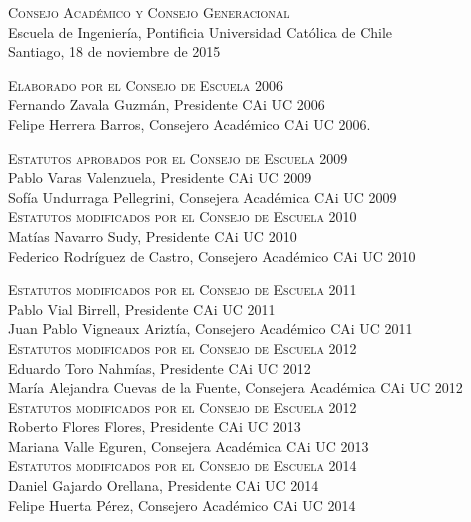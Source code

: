 \documentclass[letterpaper,11pt]{article}
\theoremstyle{definition}%
\begin{document}
\vfill

\begin{sloppypar}
	\textsc{Consejo Académico y Consejo Generacional}\\
	Escuela de Ingeniería, Pontificia Universidad Católica de Chile\\
	Santiago, 18 de noviembre de 2015

	\textsc{Elaborado por el Consejo de Escuela 2006}\\
	Fernando Zavala Guzmán, Presidente CAi UC 2006\\
	Felipe Herrera Barros, Consejero Académico CAi UC 2006.

	\textsc{Estatutos aprobados por el Consejo de Escuela 2009}\\
	Pablo Varas Valenzuela, Presidente CAi UC 2009\\
	Sofía Undurraga Pellegrini, Consejera Académica CAi UC 2009\\

	\textsc{Estatutos modificados por el Consejo de Escuela 2010}\\
	Matías Navarro Sudy, Presidente CAi UC 2010\\
	Federico Rodríguez de Castro, Consejero Académico CAi UC 2010

	\textsc{Estatutos modificados por el Consejo de Escuela 2011}\\
	Pablo Vial Birrell, Presidente CAi UC 2011\\
	Juan Pablo Vigneaux Ariztía, Consejero Académico CAi UC 2011\\

	\textsc{Estatutos modificados por el Consejo de Escuela 2012}\\
	Eduardo Toro Nahmías, Presidente CAi UC 2012\\
	María Alejandra Cuevas de la Fuente, Consejera Académica CAi UC 2012\\

	\textsc{Estatutos modificados por el Consejo de Escuela 2012}\\
	Roberto Flores Flores, Presidente CAi UC 2013\\
	Mariana Valle Eguren, Consejera Académica CAi UC 2013\\

	\textsc{Estatutos modificados por el Consejo de Escuela 2014}\\
	Daniel Gajardo Orellana, Presidente CAi UC 2014\\
	Felipe Huerta Pérez, Consejero Académico CAi UC 2014\\


\end{sloppypar}
\end{document}
